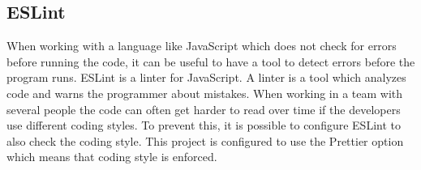 \subsection{ESLint}
When working with a language like JavaScript which does not check for errors before running the code, it can be useful to have a tool to detect errors before the program runs. ESLint\cite{eslint} is a linter for JavaScript. A linter is a tool which analyzes code and warns the programmer about mistakes. When working in a team with several people the code can often get harder to read over time if the developers use different coding styles. To prevent this, it is possible to configure ESLint to also check the coding style. This project is configured to use the Prettier\cite{prettier} option which means that coding style is enforced.